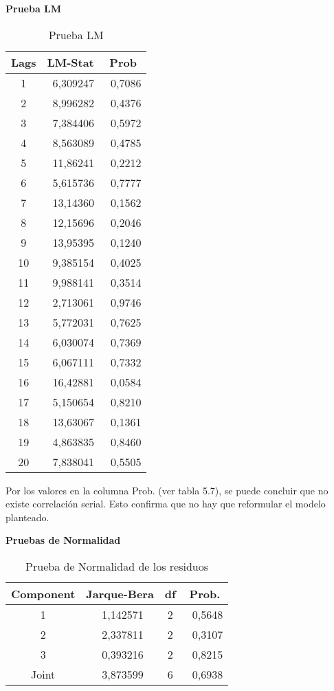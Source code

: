\textbf{Prueba LM}

\begin{table}[H]
\centering
\begin{tabular}{ccc}\hline\hline
Lags & LM-Stat & Prob \\ \hline\hline
1 & ~6,309247 & ~0,7086 \\
2 & ~8,996282 & ~0,4376 \\
3 & ~7,384406 & ~0,5972 \\
4 & ~8,563089 & ~0,4785 \\
5 & ~11,86241 & ~0,2212 \\
6 & ~5,615736 & ~0,7777 \\
7 & ~13,14360 & ~0,1562 \\
8 & ~12,15696 & ~0,2046 \\
9 & ~13,95395 & ~0,1240 \\
10& ~9,385154 & ~0,4025 \\
11& ~9,988141 & ~0,3514 \\
12& ~2,713061 & ~0,9746 \\
13& ~5,772031 & ~0,7625 \\
14& ~6,030074 & ~0,7369 \\
15& ~6,067111 & ~0,7332 \\
16& ~16,42881 & ~0,0584 \\
17& ~5,150654 & ~0,8210 \\
18& ~13,63067 & ~0,1361 \\
19& ~4,863835 & ~0,8460 \\
20& ~7,838041 & ~0,5505 \\ \hline\hline
\end{tabular}
\caption{Prueba LM}
\label{tab20}
\end{table}

Por los valores en la columna Prob. (ver tabla 5.7), se puede concluir que no existe correlaci\'{o}n serial. Esto confirma que no hay que reformular el modelo planteado.\newline

\textbf{Pruebas de Normalidad}

\begin{table}[H]
\centering
\begin{tabular}{cccc}\hline\hline
Component & Jarque-Bera & df & Prob. \\ \hline\hline
1 & ~1,142571 & 2 & ~0,5648 \\
2 & ~2,337811 & 2 & ~0,3107 \\
3 & ~0,393216 & 2 & ~0,8215 \\ \hline\hline
Joint & ~3,873599 & 6 & ~0,6938 \\ \hline\hline
\end{tabular}
\caption{Prueba de Normalidad de los residuos}
\label{tab21}
\end{table}

